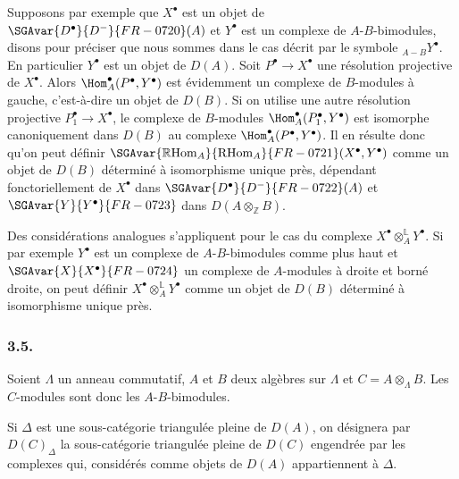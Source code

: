 Supposons par exemple que $X^\bullet$ est un objet de $\SGAvar{D^\bullet}{D^-}{FR-0720}(A)$ et $Y^\bullet$ est un complexe de $A$-$B$-bimodules, disons pour préciser que nous sommes dans le cas décrit par le symbole ${}_{A-B}Y^\bullet$. En particulier $Y^\bullet$ est un objet de $D(A)$. Soit $P^\bullet\to X^\bullet$ une résolution projective de $X^\bullet$. Alors $\Hom_A^\bullet(P^\bullet,Y^\bullet)$ est évidemment un complexe de $B$-modules à gauche, c'est-à-dire un objet de $D(B)$. Si on utilise une autre résolution projective $P_1^\bullet\to X^\bullet$, le complexe de $B$-modules $\Hom_A^\bullet(P_1^\bullet,Y^\bullet)$ est isomorphe canoniquement dans $D(B)$ au complexe $\Hom_A^\bullet(P^\bullet,Y^\bullet)$. Il en résulte donc qu'on peut définir $\SGAvar{\mathbb{R}\mathrm{Hom}_A}{\mathrm{RHom}_A}{FR-0721}(X^\bullet,Y^\bullet)$ comme un objet de $D(B)$ déterminé à isomorphisme unique près, dépendant fonctoriellement de $X^\bullet$ dans $\SGAvar{D^\bullet}{D^-}{FR-0722}(A)$ et $\SGAvar{Y}{Y^\bullet}{FR-0723}$ dans $D(A\otimes_{\mathbb{Z}}B)$.

Des considérations analogues s'appliquent pour le cas du complexe $X^\bullet\otimes_A^{\mathbb{L}}Y^\bullet$. Si par exemple $Y^\bullet$ est un complexe de $A$-$B$-bimodules comme plus haut et $\SGAvar{X}{X^\bullet}{FR-0724}$  un complexe de $A$-modules à droite et borné  droite, on peut définir $X^\bullet\otimes_A^{\mathbb{L}}Y^\bullet$ comme un objet de $D(B)$ déterminé à isomorphisme unique près.

\subsubsection*{3.5.}

Soient $\Lambda$ un anneau commutatif, $A$ et $B$ deux algèbres sur $\Lambda$ et
$C=A\otimes_{\Lambda}B$. Les $C$-modules sont donc les $A$-$B$-bimodules.

Si $\Delta$ est une sous-catégorie triangulée pleine de $D(A)$, on désignera par $D(C)_{\Delta}$ la sous-catégorie triangulée pleine de $D(C)$ engendrée par les complexes qui, considérés comme objets de $D(A)$ appartiennent à $\Delta$.

